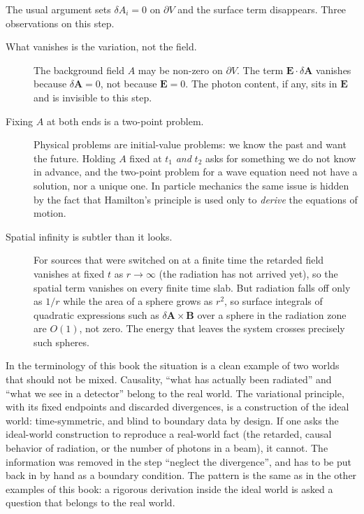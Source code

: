 The usual argument sets $\delta A_i=0$ on $\partial V$ and the surface
term disappears. Three observations on this step.
\begin{description}
    \item [What vanishes is the variation, not the field.] The
background field $A$ may be non-zero on $\partial V$. The term
$\mathbf E\cdot\delta\mathbf A$ vanishes because $\delta\mathbf A=0$, not
because $\mathbf E=0$. The photon content, if any, sits in $\mathbf E$ and
is invisible to this step.
\item [Fixing $A$ at both ends is a two-point problem.] Physical
problems are initial-value problems: we know the past and want the future.
Holding $A$ fixed at $t_1$ \emph{and} $t_2$ asks for something we do not
know in advance, and the two-point problem for a wave equation need not
have a solution, nor a unique one. In
particle mechanics the same issue is hidden by the fact that Hamilton's
principle is used only to \emph{derive} the equations of motion.
\item [Spatial infinity is subtler than it looks.] For sources that
were switched on at a finite time the retarded field vanishes at fixed $t$
as $r\to\infty$ (the radiation has not arrived yet), so the spatial term
vanishes on every finite time slab. But radiation falls off only as $1/r$
while the area of a sphere grows as $r^2$, so surface integrals of
quadratic expressions such as $\delta\mathbf A\times\mathbf B$ over a
sphere in the radiation zone are $O(1)$, not zero. The energy that leaves
the system crosses precisely such spheres.
\end{description}

In the terminology of this book the situation is a clean example of two
worlds that should not be mixed. Causality, ``what has actually been
radiated'' and ``what we see in a detector'' belong to the real world. The
variational principle, with its fixed endpoints and discarded divergences,
is a construction of the ideal world: time-symmetric, and blind to
boundary data by design. If one asks the ideal-world construction to
reproduce a real-world fact (the retarded, causal behavior of radiation, or
the number of photons in a beam), it cannot. The information was removed in
the step ``neglect the divergence'', and has to be put back in by hand as a
boundary condition. The pattern is the same as in the other examples of this book: a
rigorous derivation inside the ideal world is asked a question that belongs
to the real world.

